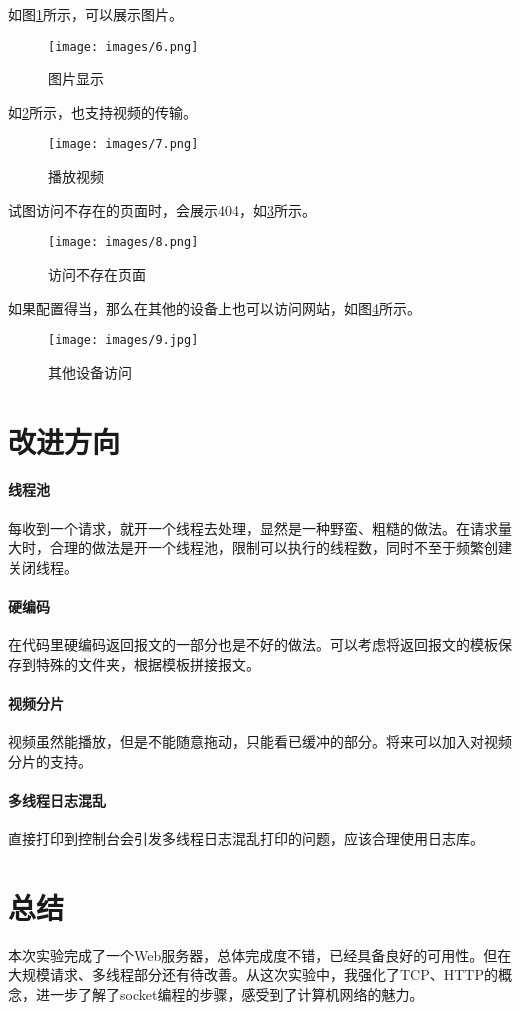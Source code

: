 \documentclass[UTF8,12pt]{ctexart}
\begin{document}
如图\ref{fig7}所示，可以展示图片。

\begin{figure}[htbp]
	\centering
	\texttt{[image: images/6.png]}
	\caption{图片显示}
	\label{fig7}
\end{figure}

如\ref{fig8}所示，也支持视频的传输。

\begin{figure}[htbp]
	\centering
	\texttt{[image: images/7.png]}
	\caption{播放视频}
	\label{fig8}
\end{figure}

试图访问不存在的页面时，会展示404，如\ref{fig9}所示。

\begin{figure}[htbp]
	\centering
	\texttt{[image: images/8.png]}
	\caption{访问不存在页面}
	\label{fig9}
\end{figure}

如果配置得当，那么在其他的设备上也可以访问网站，如图\ref{fig10}所示。

\begin{figure}[htbp]
	\centering
	\texttt{[image: images/9.jpg]}
	\caption{其他设备访问}
	\label{fig10}
\end{figure}

\section{改进方向}

\paragraph{线程池} 每收到一个请求，就开一个线程去处理，显然是一种野蛮、粗糙的做法。在请求量大时，合理的做法是开一个线程池，限制可以执行的线程数，同时不至于频繁创建关闭线程。

\paragraph{硬编码} 在代码里硬编码返回报文的一部分也是不好的做法。可以考虑将返回报文的模板保存到特殊的文件夹，根据模板拼接报文。

\paragraph{视频分片} 视频虽然能播放，但是不能随意拖动，只能看已缓冲的部分。将来可以加入对视频分片的支持。

\paragraph{多线程日志混乱} 直接打印到控制台会引发多线程日志混乱打印的问题，应该合理使用日志库。

\section{总结}

本次实验完成了一个Web服务器，总体完成度不错，已经具备良好的可用性。但在大规模请求、多线程部分还有待改善。从这次实验中，我强化了TCP、HTTP的概念，进一步了解了socket编程的步骤，感受到了计算机网络的魅力。
	
\end{document}
